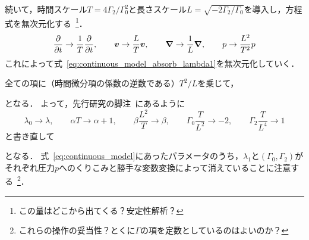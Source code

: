 \documentclass[12pt,dvipdfmx,svgnames,a4paper,uplatex]{ujarticle}
\theoremstyle{plain}
\begin{document}
続いて，時間スケール\(T = 4\Gamma_2/\Gamma_0^2\)と長さスケール\(L = \sqrt{-2\Gamma_2/\Gamma_0}\)を導入し，方程式を無次元化する~\footnote{この量はどこから出てくる？安定性解析？}．
\begin{equation}
  \pdv{t} \to \frac{1}{T} \pdv{t}, \qquad \vb*{v} \to \frac{L}{T} \vb*{v}, \qquad \grad \to \frac{1}{L} \grad, \qquad p \to \frac{L^2}{T^2} p
  \label{eq:nondimensionalization_list}
\end{equation}
これによって式~\ref{eq:continuous_model_absorb_lambda1}を無次元化していく．
全ての項に（時間微分項の係数の逆数である）\(T^2/L\)を乗じて，
となる．
よって，先行研究の脚注~\cite[脚注28]{James2017}にあるように
\begin{equation}
  \lambda_0 \to \lambda, \qquad \alpha T \to \alpha + 1, \qquad \beta \frac{L^2}{T} \to \beta, \qquad \Gamma_0 \frac{T}{L^2} \to -2, \qquad \Gamma_2 \frac{T}{L^4} \to 1
  \label{eq:redefine_parameters}
\end{equation}
と書き直して
となる．
式~\ref{eq:continuous_model}にあったパラメータのうち，\(\lambda_1\)と\((\Gamma_0, \Gamma_2)\)がそれぞれ圧力\(p\)へのくりこみと勝手な変数変換によって消えていることに注意する~\footnote{これらの操作の妥当性？とくに\(\Gamma\)の項を定数としているのはよいのか？}．
\end{document}
